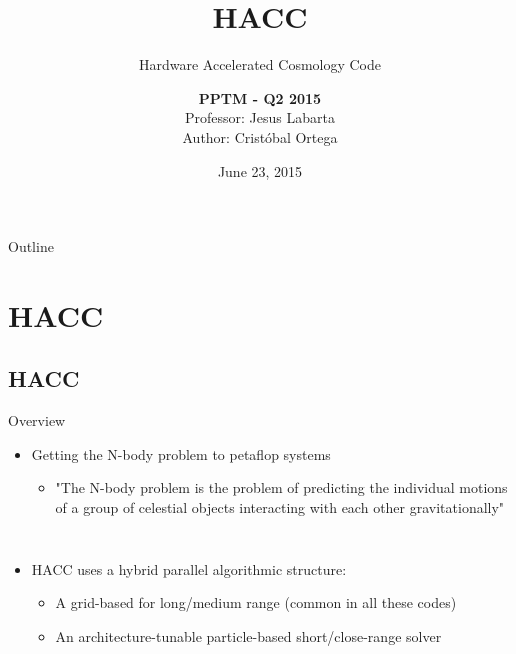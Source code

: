 \documentclass[aspectratio=169]{bredelebeamer}
\title{HACC\\}
\subtitle{Hardware Accelerated Cosmology Code}
\author{
\textbf{PPTM - Q2 2015} \\
Professor: Jesus Labarta \\
Author: Cristóbal Ortega}
\date{June 23, 2015}
\begin{document}
\begin{frame}[plain]
  \titlepage
\end{frame}


\begin{frame}{Outline}
  \tableofcontents
\end{frame}



\section{HACC}
\subsection{HACC }
\begin{frame}{Overview}
\begin{itemize}

\item Getting the N-body problem to petaflop systems
\begin{itemize}
	\item "The N-body problem is the problem of predicting the individual motions of a group of celestial objects interacting with each other gravitationally"
\end{itemize}

\end{itemize}

\begin{columns}
\hspace*{0.5cm}

\begin{itemize}

\item HACC uses a hybrid parallel algorithmic structure:
\begin{itemize}
	\item A grid-based for long/medium range (common in all these codes)
	\item An architecture-tunable particle-based short/close-range solver
\end{itemize}


\end{itemize}
\end{columns}
\end{frame}
\end{document}
